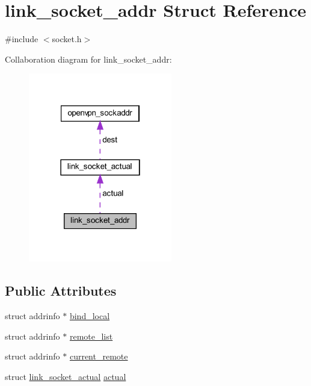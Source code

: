 \hypertarget{structlink__socket__addr}{}\section{link\+\_\+socket\+\_\+addr Struct Reference}
\label{structlink__socket__addr}


{\ttfamily \#include $<$socket.\+h$>$}



Collaboration diagram for link\+\_\+socket\+\_\+addr\+:
\nopagebreak
\begin{figure}[H]
\begin{center}
\leavevmode
\includegraphics[width=178pt]{structlink__socket__addr__coll__graph}
\end{center}
\end{figure}
\subsection*{Public Attributes}
\begin{DoxyCompactItemize}
\item 
struct addrinfo $\ast$ \hyperlink{structlink__socket__addr_a5a4d9686ebf0ef5a00117de888ac78cf}{bind\+\_\+local}
\item 
struct addrinfo $\ast$ \hyperlink{structlink__socket__addr_a4eb1c90dc35a5fcd2952072cbe8f6c83}{remote\+\_\+list}
\item 
struct addrinfo $\ast$ \hyperlink{structlink__socket__addr_a86eeebfb3c5eee93573fa9b577b12f7a}{current\+\_\+remote}
\item 
struct \hyperlink{structlink__socket__actual}{link\+\_\+socket\+\_\+actual} \hyperlink{structlink__socket__addr_a31cf151a4d7544429e7740cbda55193c}{actual}
\end{DoxyCompactItemize}


